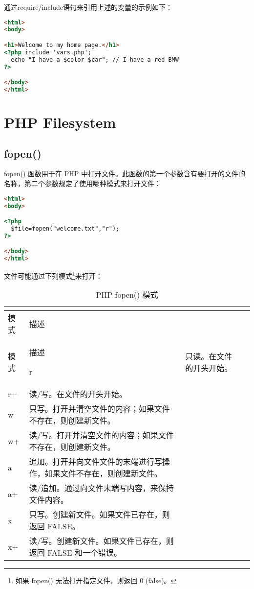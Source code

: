 通过require/include语句来引用上述的变量的示例如下：


\begin{lstlisting}[language=HTML]
<html>
<body>

<h1>Welcome to my home page.</h1>
<?php include 'vars.php';
  echo "I have a $color $car"; // I have a red BMW
?>

</body>
</html>
\end{lstlisting}







\chapter{PHP Filesystem}




\section{fopen()}


fopen() 函数用于在 PHP 中打开文件。此函数的第一个参数含有要打开的文件的名称，第二个参数规定了使用哪种模式来打开文件：

\begin{lstlisting}[language=HTML]
<html>
<body>

<?php
  $file=fopen("welcome.txt","r");
?>

</body>
</html>
\end{lstlisting}

文件可能通过下列模式\footnote{如果 fopen() 无法打开指定文件，则返回 0 (false)。}来打开：


\begin{longtable}{|m{50pt}|m{300pt}|}
\tabularnewline\hline
模式	&描述
\endhead

\caption{PHP fopen() 模式}\\
\hline
模式	&描述
\endfirsthead

\endfoot

\endlastfoot

\hline
r	&只读。在文件的开头开始。\\
\hline
r+	&读/写。在文件的开头开始。\\
\hline
w	&只写。打开并清空文件的内容；如果文件不存在，则创建新文件。\\
\hline
w+	&读/写。打开并清空文件的内容；如果文件不存在，则创建新文件。\\
\hline
a	&追加。打开并向文件文件的末端进行写操作，如果文件不存在，则创建新文件。\\
\hline
a+	&读/追加。通过向文件末端写内容，来保持文件内容。\\
\hline
x	&只写。创建新文件。如果文件已存在，则返回 FALSE。\\
\hline
x+	&读/写。创建新文件。如果文件已存在，则返回 FALSE 和一个错误。\\
\hline
\end{longtable}

